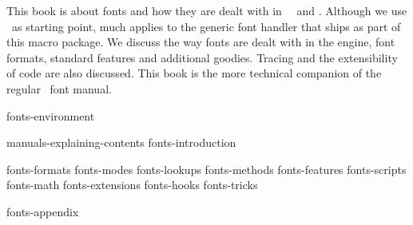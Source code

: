 
%
%

%


\enablemode[simple] %

\startbuffer[abstract]

    This book is about fonts and how they are dealt with in \CONTEXT\ \MKIV\ and
    \LUATEX. Although we use \CONTEXT\ as starting point, much applies to the
    generic font handler that ships as part of this macro package. We discuss the
    way fonts are dealt with in the engine, font formats, standard features and
    additional goodies. Tracing and the extensibility of code are also discussed.
    This book is the more technical companion of the regular \CONTEXT\ font
    manual.

\stopbuffer

\environment fonts-environment

\startdocument
  [author=Hans Hagen,
   title=Fonts out of \ConTeXt,
   subtitle=explaining luatex and mkiv,
   affiliation=PRAGMA ADE,
   comment=work in progress,
   cover:color:1=darkred,
   cover:color:2=darkgreen,
   cover:color:3=darkblue,
   cover:color:4=darkyellow,
   cover:color:5=darkgray]

    \startfrontmatter
        \component manuals-explaining-contents
        \component fonts-introduction
    \stopfrontmatter

    \startbodymatter
        \component fonts-formats
        \component fonts-modes
        \component fonts-lookups
        \component fonts-methods
        \component fonts-features
        \component fonts-scripts
        \component fonts-math
        \component fonts-extensions
        \component fonts-hooks
        \component fonts-tricks
    \stopbodymatter

    \startappendices
        \component fonts-appendix
    \stopappendices

\stopdocument
